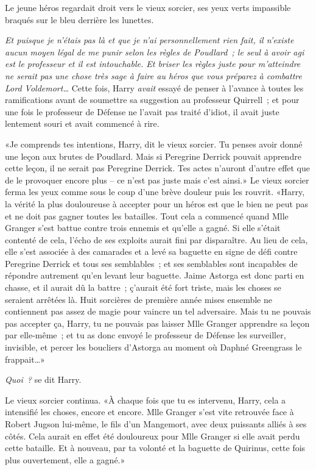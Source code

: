 Le jeune héros regardait droit vers le vieux sorcier, ses yeux verts impassible braqués sur le bleu derrière les lunettes.

\emph{Et puisque je n'étais pas là et que je n'ai personnellement rien fait, il n'existe aucun moyen légal de me punir selon les règles de Poudlard~; le seul à avoir agi est le professeur et il est intouchable. Et briser les règles juste pour m'atteindre ne serait pas une chose très sage à faire au héros que vous préparez à combattre Lord Voldemort…} Cette fois, Harry \emph{avait} essayé de penser à l'avance à toutes les ramifications avant de soumettre sa suggestion au professeur Quirrell~; et pour une fois le professeur de Défense ne l'avait pas traité d'idiot, il avait juste lentement souri et avait commencé à rire.

«Je comprends tes intentions, Harry, dit le vieux sorcier. Tu penses avoir donné une leçon aux brutes de Poudlard. Mais si Peregrine Derrick pouvait apprendre cette leçon, il ne serait pas Peregrine Derrick. Tes actes n'auront d'autre effet que de le provoquer encore plus -- ce n'est pas juste mais c'est ainsi.» Le vieux sorcier ferma les yeux comme sous le coup d'une brève douleur puis les rouvrit. «Harry, la vérité la plus douloureuse à accepter pour un héros est que le bien ne peut pas et ne doit pas gagner toutes les batailles. Tout cela a commencé quand Mlle Granger s'est battue contre trois ennemis et qu'elle a gagné. Si elle s'était contenté de cela, l'écho de ses exploits aurait fini par disparaître. Au lieu de cela, elle s'est associée à des camarades et a levé sa baguette en signe de défi contre Peregrine Derrick et tous ses semblables~; et ses semblables sont incapables de répondre autrement qu'en levant leur baguette. Jaime Astorga est donc parti en chasse, et il aurait dû la battre~; ç'aurait été fort triste, mais les choses se seraient arrêtées là. Huit sorcières de première année mises ensemble ne contiennent pas assez de magie pour vaincre un tel adversaire. Mais tu ne pouvais pas accepter ça, Harry, tu ne pouvais pas laisser Mlle Granger apprendre sa leçon par elle-même~; et tu as donc envoyé le professeur de Défense les surveiller, invisible, et percer les boucliers d'Astorga au moment où Daphné Greengrass le frappait…»

\emph{Quoi~?} se dit Harry.

Le vieux sorcier continua. «À chaque fois que tu es intervenu, Harry, cela a intensifié les choses, encore et encore. Mlle Granger s'est vite retrouvée face à Robert Jugson lui-même, le fils d'un Mangemort, avec deux puissants alliés à ses côtés. Cela aurait en effet été douloureux pour Mlle Granger si elle avait perdu cette bataille. Et à nouveau, par ta volonté et la baguette de Quirinus, cette fois plus ouvertement, elle a gagné.»

